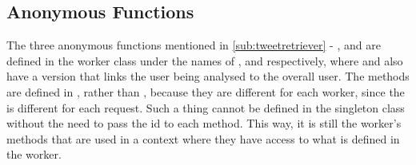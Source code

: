 \subsection{Anonymous Functions}
The three anonymous functions mentioned in \autoref{sub:tweetretriever} -
,  and  are defined in the
worker class under the names of ,
 and  respectively, where
 and  also have a version
that links the user being analysed to the overall user. The methods are defined
in , rather than , because they are
different for each worker, since the  is different for each
request. Such a thing cannot be defined in the singleton class without the need
to pass the id to each method. This way, it is still the worker's methods that
are used in a context where they have access to what is defined in the worker.